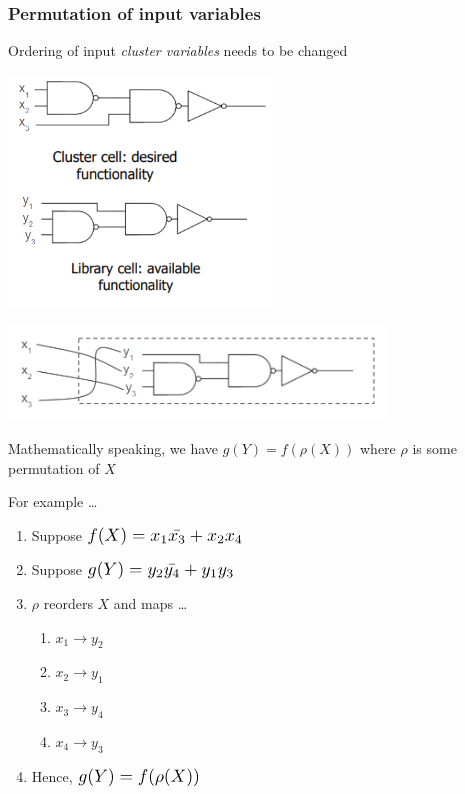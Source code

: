 \documentclass{article}
\newcommand*{\Scale}[2][4]{\scalebox{#1}{\ensuremath{#2}}}%
\begin{document}
\subsubsection{Permutation of input variables}
Ordering of input \textit{cluster variables} needs to be changed

\begin{minipage}[c]{0.5\textwidth}
    \centering
    \includegraphics[width=7cm, scale=1]{S5/permute_cluster_library.PNG}
    \captionsetup{justification=centering}
\end{minipage}%
\begin{minipage}[c]{0.5\textwidth}
    \centering
    \includegraphics[width=10cm, scale=1]{S5/permutation.PNG}
    \captionsetup{justification=centering}
\end{minipage}%

\vspace{0.5cm}
Mathematically speaking, we have $g(Y) = f(\rho(X))$ where $\rho$ is some permutation of $X$

For example \dots

\begin{enumerate}[label*=\arabic*.]
    \item Suppose $\Scale[1.25]{f(X) = x_{1}\bar{x_{3}} + x_{2}x_{4}}$
    \item Suppose $\Scale[1.25]{g(Y) = y_{2}\bar{y_{4}} + y_{1}y_{3}}$
    \item $\rho$ reorders $X$ and maps \dots
        \begin{enumerate}[label*=\arabic*.]
            \item $x_{1} \xrightarrow{} y_{2}$
            \item $x_{2} \xrightarrow{} y_{1}$
            \item $x_{3} \xrightarrow{} y_{4}$
            \item $x_{4} \xrightarrow{} y_{3}$
        \end{enumerate}
    \item Hence, $\Scale[1.25]{g(Y) = f(\rho(X))}$
\end{enumerate}
\end{document}
